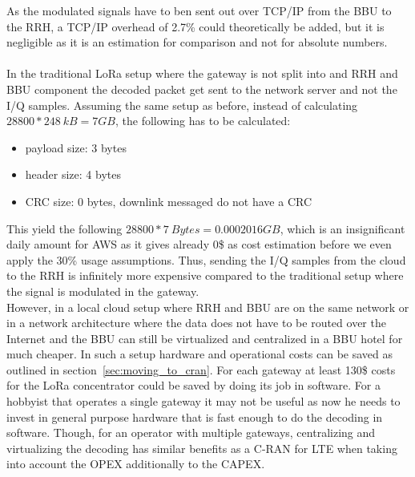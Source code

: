 As the modulated signals have to ben sent out over TCP/IP from the BBU to the RRH, a TCP/IP overhead 
of 2.7\% could theoretically be added, but it is negligible as it is an estimation for 
comparison and not for absolute numbers.
\\
\\
In the traditional LoRa setup where the gateway is not split into and RRH and BBU 
component the decoded packet get sent to the network server and not the I/Q samples.
Assuming the same setup as before, instead of calculating $28800 * 248~kB = 7 GB$, the following
has to be calculated: 

\begin{itemize}
    \item payload size: 3 bytes
    \item header size: 4 bytes
    \item CRC size: 0 bytes, downlink messaged do not have a CRC
\end{itemize}

This yield the following $28800 * 7~Bytes = 0.0002016 GB$, which is an insignificant daily amount for AWS as
it gives already 0\$ as cost estimation before we even apply the 30\% usage assumptions.
Thus, sending the I/Q samples from the cloud to the RRH is infinitely more expensive compared to the traditional setup 
where the signal is modulated in the gateway. 
\\
However, in a local cloud setup where RRH and BBU are on the same network
or in a network architecture where the data does not have to be routed over the Internet and 
the BBU can still be virtualized and centralized in a BBU hotel for much cheaper.
In such a setup hardware and operational costs can be saved as outlined in section~\ref{sec:moving_to_cran}.
For each gateway at least 130\$ costs for the LoRa concentrator could be saved by doing its job in software.
For a hobbyist that operates a single gateway it may not be useful as now he needs to invest in general purpose hardware 
that is fast enough to do the decoding in software. Though, for an operator with multiple gateways, centralizing and virtualizing
the decoding has similar benefits as a C-RAN for LTE when taking into account the OPEX additionally to the CAPEX.

